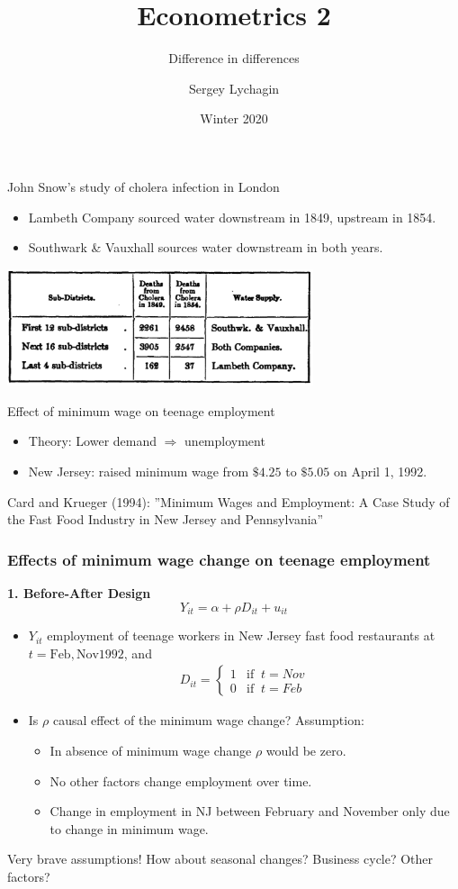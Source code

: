 \documentclass[notes=show,beamer,compress]{beamer}
\title[Difference in differences]{Econometrics 2}
\subtitle{Difference in differences}
\author[Lychagin \& Mu\c{c}o]{Sergey Lychagin}
\institute[CEU]{CEU}
\date{Winter 2020}
\begin{document}
\frame{\titlepage}

\begin{frame}{John Snow's study of cholera infection in London}

\begin{itemize}
	\item{Lambeth Company sourced water downstream in 1849, upstream in 1854.}
	\item{Southwark \& Vauxhall sources water downstream in both years.}
\end{itemize} 
\includegraphics[width=9cm]{graphs/table12.png}

\end{frame}

\begin{frame}{Effect of minimum wage on teenage employment}
	\begin{itemize}
		\item Theory: Lower demand $\Rightarrow$ unemployment
		\item New Jersey: raised minimum wage from $\$4.25$ to $\$5.05$ on April 1, 1992.
	\end{itemize}
	Card and Krueger (1994): ''Minimum Wages and Employment: A Case Study of the Fast Food Industry in New Jersey and Pennsylvania''
\end{frame}

\begin{frame}
\frametitle{Effects of minimum wage change on teenage employment}

\textbf{1. Before-After Design}
\[
Y_{it} = \alpha + \rho D_{it}+ u_{it}
\]

\begin{itemize}
	\item $Y_{it}$ employment of teenage workers in New Jersey fast food restaurants at $t= \text{Feb}, \text{Nov} 1992$, and
	\begin{eqnarray*} D_{it}= \left\{ \begin{array}{cc}
			1 & \text{if}\;\; t=Nov \\
			0 & \text{if}\;\; t=Feb
		\end{array} \right.
	\end{eqnarray*}
	\item  Is $\rho$  causal effect of the minimum wage change? Assumption:
	\begin {itemize}
	\item In absence of minimum wage change $\rho$ would be zero.
	\item No other factors change employment over time.
	\item Change in employment in NJ between February and November only due to change in minimum wage.	
	\end {itemize}
	\end {itemize}
	Very brave assumptions! How about seasonal changes? Business cycle? Other factors?
\end{frame}
\end{document}
